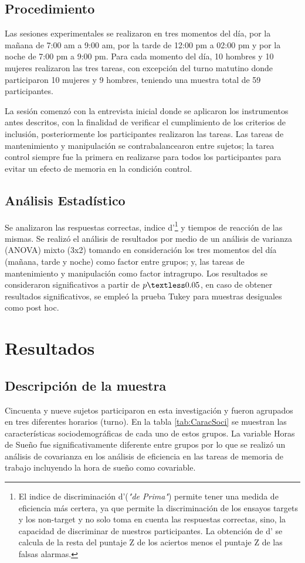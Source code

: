 \documentclass[12pt,letterpaper,final]{article}
\begin{document}
{
\subsection{Procedimiento}
Las sesiones experimentales se realizaron en tres momentos del día, por la mañana de 7:00 am a 9:00 am, por la tarde de 12:00 pm a 02:00 pm y por la noche de 7:00 pm a 9:00 pm. Para cada momento del día, 10 hombres y 10 mujeres realizaron  las tres tareas, con excepción del turno matutino donde participaron 10 mujeres y 9 hombres, teniendo una muestra total de 59 participantes.

La sesión comenzó con la entrevista inicial donde se aplicaron los instrumentos antes descritos, con la finalidad de verificar el cumplimiento de los criterios de inclusión, posteriormente los participantes realizaron las tareas. Las tareas de mantenimiento y manipulación se contrabalancearon entre sujetos; la tarea control siempre fue la primera en realizarse para todos los participantes para evitar un efecto de memoria en la condición control.
}
{
\subsection{Análisis Estadístico}
Se analizaron las respuestas correctas, indice d'\footnote{El indice de discriminación d’(\textit{"de Prima"}) permite tener una medida de eficiencia más certera, ya que permite la discriminación de los ensayos targets y los non-target  y no solo toma en cuenta las respuestas correctas, sino, la capacidad de discriminar de nuestros participantes.  La obtención de d’ se calcula de la resta del puntaje Z de los aciertos menos el puntaje Z de las falsas alarmas.} y tiempos de reacción de las mismas. Se realizó el análisis de resultados  por medio de un análisis de varianza (ANOVA) mixto (3x2) tomando en consideración los tres momentos del día (mañana, tarde y noche) como factor entre grupos; y, las tareas de mantenimiento y manipulación como factor intragrupo.
Los resultados se consideraron significativos a partir de $ p\textless0.05$, en caso de obtener resultados significativos, se empleó la prueba Tukey para muestras desiguales como post hoc.
}
\newpage

\section{Resultados}
\subsection{Descripción de la muestra}
Cincuenta y nueve sujetos participaron en esta investigación y fueron  agrupados en tres diferentes horarios (turno). En la tabla \ref{tab:CaracSoci} se muestran las características sociodemográficas de cada uno de estos grupos. La variable Horas de Sueño fue significativamente diferente entre grupos por lo que se realizó un análisis de covarianza en los análisis de eficiencia en las tareas de memoria de trabajo incluyendo la hora de sueño como covariable. 
\end{document}

